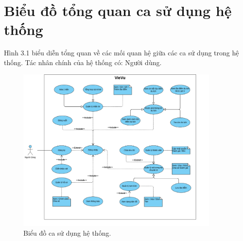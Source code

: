 \section{Biểu đồ tổng quan ca sử dụng hệ thống}
Hình 3.1 biểu diễn tổng quan về các mối quan hệ giữa các ca sử dụng trong hệ
thống. Tác nhân chính của hệ thống có: Người dùng.
\begin{figure}[H]
    \centering
    \includegraphics[width=0.9\textwidth]{figures/c3/3-2-usecases.png}
    \caption{Biểu đồ ca sử dụng hệ thống.}
    \label{fig:3-2-usecases}
\end{figure}